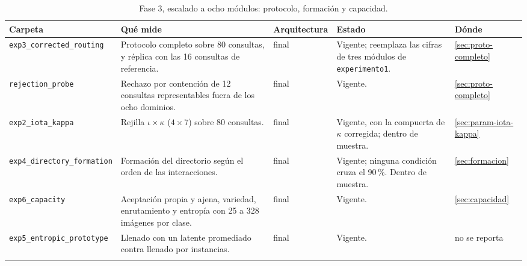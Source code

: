 \begin{table}[H]
\centering
\caption[Fase 3, escalado a ocho módulos: protocolo, formación y capacidad]{Fase 3, escalado a ocho módulos: protocolo, formación y capacidad.}
\label{tab:fase3-experimentos}
\footnotesize
\setlength{\tabcolsep}{3pt}
\begin{tabular}{p{3.1cm}p{4.7cm}p{2.0cm}p{3.1cm}p{1.6cm}}
\toprule
Carpeta & Qué mide & Arquitectura & Estado & Dónde \tabularnewline
\midrule
\raggedright \texttt{exp3\_\allowbreak corrected\_\allowbreak routing} &
\raggedright Protocolo completo sobre 80 consultas, y réplica con las 16 consultas de referencia. &
\raggedright final &
\raggedright Vigente; reemplaza las cifras de tres módulos de \texttt{experimento1}. &
\raggedright \ref{sec:proto-completo} \tabularnewline\addlinespace[4pt]
\raggedright \texttt{rejection\_\allowbreak probe} &
\raggedright Rechazo por contención de 12 consultas representables fuera de los ocho dominios. &
\raggedright final &
\raggedright Vigente. &
\raggedright \ref{sec:proto-completo} \tabularnewline\addlinespace[4pt]
\raggedright \texttt{exp2\_\allowbreak iota\_\allowbreak kappa} &
\raggedright Rejilla $\iota \times \kappa$ ($4 \times 7$) sobre 80 consultas. &
\raggedright final &
\raggedright Vigente, con la compuerta de $\kappa$ corregida; dentro de muestra. &
\raggedright \ref{sec:param-iota-kappa} \tabularnewline\addlinespace[4pt]
\raggedright \texttt{exp4\_\allowbreak directory\_\allowbreak formation} &
\raggedright Formación del directorio según el orden de las interacciones. &
\raggedright final &
\raggedright Vigente; ninguna condición cruza el 90\,\%. Dentro de muestra. &
\raggedright \ref{sec:formacion} \tabularnewline\addlinespace[4pt]
\raggedright \texttt{exp6\_\allowbreak capacity} &
\raggedright Aceptación propia y ajena, variedad, enrutamiento y entropía con 25 a 328 imágenes por clase. &
\raggedright final &
\raggedright Vigente. &
\raggedright \ref{sec:capacidad} \tabularnewline\addlinespace[4pt]
\raggedright \texttt{exp5\_\allowbreak entropic\_\allowbreak prototype} &
\raggedright Llenado con un latente promediado contra llenado por instancias. &
\raggedright final &
\raggedright Vigente. &
\raggedright no se reporta \tabularnewline\addlinespace[4pt]
\bottomrule
\end{tabular}
\end{table}

